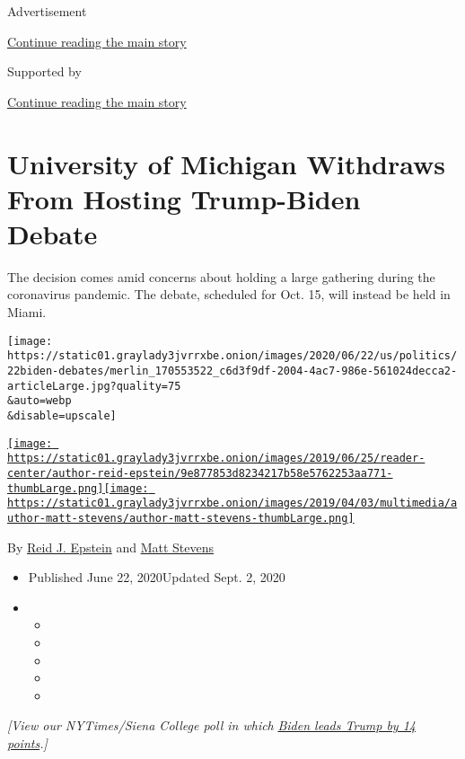 Advertisement

\protect\hyperlink{after-top}{Continue reading the main story}

Supported by

\protect\hyperlink{after-sponsor}{Continue reading the main story}

\hypertarget{university-of-michigan-withdraws-from-hosting-trump-biden-debate}{%
\section{University of Michigan Withdraws From Hosting Trump-Biden
Debate}\label{university-of-michigan-withdraws-from-hosting-trump-biden-debate}}

The decision comes amid concerns about holding a large gathering during
the coronavirus pandemic. The debate, scheduled for Oct. 15, will
instead be held in Miami.

\texttt{[image: https://static01.graylady3jvrrxbe.onion/images/2020/06/22/us/politics/22biden-debates/merlin\_170553522\_c6d3f9df-2004-4ac7-986e-561024decca2-articleLarge.jpg?quality=75\\\&auto=webp\\\&disable=upscale]}

\href{https://www.nytimes3xbfgragh.onion/by/reid-j-epstein}{\texttt{[image: https://static01.graylady3jvrrxbe.onion/images/2019/06/25/reader-center/author-reid-epstein/9e877853d8234217b58e5762253aa771-thumbLarge.png]}}\href{https://www.nytimes3xbfgragh.onion/by/matt-stevens}{\texttt{[image: https://static01.graylady3jvrrxbe.onion/images/2019/04/03/multimedia/author-matt-stevens/author-matt-stevens-thumbLarge.png]}}

By \href{https://www.nytimes3xbfgragh.onion/by/reid-j-epstein}{Reid J.
Epstein} and
\href{https://www.nytimes3xbfgragh.onion/by/matt-stevens}{Matt Stevens}

\begin{itemize}
\item
  Published June 22, 2020Updated Sept. 2, 2020
\item
  \begin{itemize}
  \item
  \item
  \item
  \item
  \item
  \end{itemize}
\end{itemize}

\emph{{[}View our NYTimes/Siena College poll in which}
\href{https://www.nytimes3xbfgragh.onion/2020/06/24/us/politics/trump-biden-poll-nyt-upshot-siena-college.html}{\emph{Biden
leads Trump by 14 points}}\emph{.{]}}

